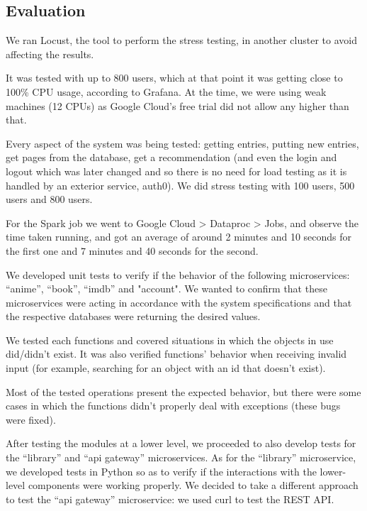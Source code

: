 \documentclass[oneside]{article}
\newcommand*\fpar{\hspace{1ex}}
\begin{document}
  \subsection{Evaluation}
  \label{sec:evaluation}
  \fpar We ran Locust, the tool to perform the stress testing, in another cluster to avoid affecting the results. 
  \par It was tested with up to 800 users, which at that point it was getting close to 100\% CPU usage, according to Grafana. At the time, we were using weak machines (12 CPUs) as Google Cloud's free trial did not allow any higher than that. 
  \par Every aspect of the system was being tested: getting entries, putting new entries, get pages from the database, get a recommendation (and even the login and logout which was later changed and so there is no need for load testing as it is handled by an exterior service, auth0). We did stress testing with 100 users, 500 users and 800 users.
  \par For the Spark job we went to Google Cloud > Dataproc > Jobs, and observe the time taken running, and got an average of around 2 minutes and 10 seconds for the first one and 7 minutes and 40 seconds for the second.
  \par We developed unit tests to verify if the behavior of the following microservices: “anime”, “book”, “imdb” and "account". We wanted to confirm that these microservices were acting in accordance with the system specifications and that the respective databases were returning the desired values.
  \par We tested each functions and covered situations in which the objects in use did/didn't exist. It was also verified functions' behavior when receiving invalid input (for example, searching for an object with an id that doesn't  exist).
  \par Most of the tested operations present the expected behavior, but there were some cases in which the functions didn't properly deal with exceptions (these bugs were fixed).
  \par After testing the modules at a lower level, we proceeded to also develop tests for the “library” and “api gateway” microservices. As for the “library” microservice, we developed tests in Python so as to verify if the interactions with the lower-level components were working properly. We decided to take a different approach to test the “api gateway” microservice: we used curl to test the REST API.
  
\end{document}
